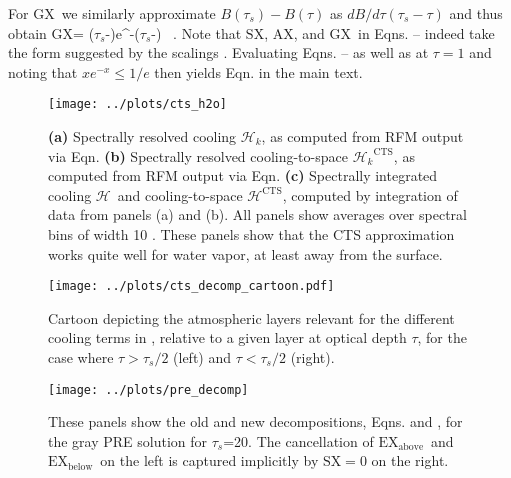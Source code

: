 \documentclass[10pt]{article}
\newcommand{\ch}{\ensuremath{\mathcal{H}}}
\newcommand{\chk}{\ensuremath{\ch_k}}
\newcommand{\taus}{\ensuremath{\tau_s}}
\newcommand{\SX}{\ensuremath{\mathrm{SX}}}
\newcommand{\AX}{\ensuremath{\mathrm{AX}}}
\newcommand{\GX}{\ensuremath{\mathrm{GX}}}
\newcommand{\CTS}{\ensuremath{\mathrm{CTS}}}
\newcommand{\EXbelow}{\ensuremath{\mathrm{EX_{below}}}}
\newcommand{\EXabove}{\ensuremath{\mathrm{EX_{above}}}}
\begin{document}
For \GX\  we similarly approximate $B(\taus) - B(\tau)$ as $dB/d\tau (\taus-\tau)$ and thus obtain
\beqn
	\GX  =    (\taus-\tau)e^{-(\taus-\tau)}  \ .
	\label{gx2}
\eeqn
Note that \SX, \AX, and \GX\  in  Eqns.  --  indeed take the form suggested by the scalings . Evaluating Eqns.  --  as well as   at $\tau=1$ and noting that $xe^{-x}\leq 1/e$ then yields Eqn.  in the main text.

\pagebreak

\begin{figure}[h]
	\begin{center}
			\texttt{[image: ../plots/cts\_h2o]}
		\caption{ \textbf{(a)} Spectrally resolved cooling \chk, as computed from RFM output via Eqn. 
	  				  \textbf{(b)} Spectrally resolved cooling-to-space $\chk^{\CTS}$, as computed from RFM output via Eqn. 
					  \textbf{(c)} Spectrally integrated cooling \ch\ and cooling-to-space $\ch^{\CTS}$, computed by integration of data from panels (a) and (b).
					  All panels show averages over spectral bins of width 10 \cminverse. These panels show that the CTS approximation works quite well for water vapor, at least away from the surface.
		\label{cts_h2o}
		}
	\end{center}
\end{figure}

\begin{figure}[h!]
	\begin{center}
			\texttt{[image: ../plots/cts\_decomp\_cartoon.pdf]}
		\caption{Cartoon depicting the atmospheric layers relevant for the different cooling terms in , relative to a given layer at optical depth $\tau$, for the case where $\tau > \taus/2$ (left) and $\tau<\taus/2$ (right).
		\label{decomp_cartoon}
		}
	\end{center}
\end{figure}

\begin{figure}[h]
	\begin{center}
			\texttt{[image: ../plots/pre\_decomp]}
		\caption{These panels show the old and new decompositions, Eqns.   and  , for the gray PRE solution  for \taus=20. The cancellation of \EXabove\ and \EXbelow\ on the left is captured implicitly by $\SX=0$ on the right.  
		\label{pre_decomp}
		}
	\end{center}
\end{figure}
\end{document}
